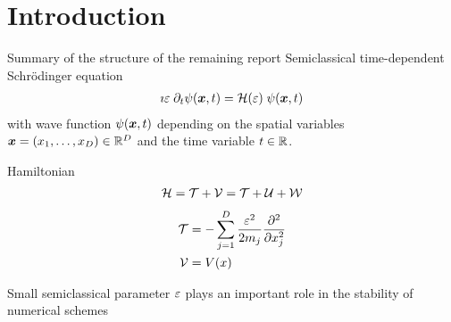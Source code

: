 





\clearemptydoublepage

\mbox{}
\vfill

\vfill
\tableofcontents

\clearpage

\listoffigures
\listofalgorithms

\clearemptydoublepage

% 
% 
% 
% 
% 
% 






\clearpage
\section{Introduction}

Summary of the structure of the remaining report
\cite{GH_convsemiclassical}
Semiclassical time-dependent Schrödinger equation
%
\begin{align}
	\label{math:tdse}
	\imath \varepsilon \; \partial_t \psi (\bm{x},t) = \mathcal{H} (\varepsilon) \; \psi (\bm{x},t)
\end{align}
%
with wave function $\psi(\bm{x},t)$ depending on the spatial variables $\bm{x} = (x_1,\dots,x_D) \in \mathbb{R}^D$ and the time variable $t \in \mathbb{R}$.

Hamiltonian
\begin{align}
	\mathcal{H} = \mathcal{T} + \mathcal{V} = \mathcal{T} + \mathcal{U} + \mathcal{W}
\end{align}
\begin{align}
	\mathcal{T} &= - \sum_{j=1}^D \frac{\varepsilon^2}{2m_j} \frac{\partial^2}{\partial x_j^2} \\
	\mathcal{V} &= V(x)
\end{align}

Small semiclassical parameter $\varepsilon$ plays an important role in the stability of numerical schemes

